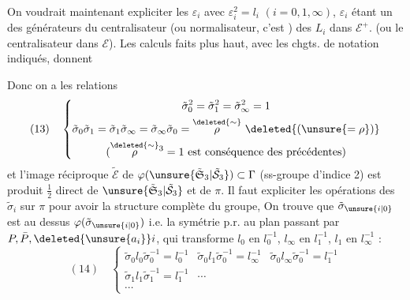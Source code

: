 On voudrait maintenant expliciter les $\varepsilon_i$ avec $\varepsilon_i^2=l_i$ $(i=0,1,\infty)$, $\varepsilon_i$ étant un des générateurs du centralisateur (ou normalisateur, c'est ) des $L_i$ dans $\mathcal E^+$. (ou le centralisateur dans $\mathcal E$). Les calculs faits plus haut, avec les chgts. de notation indiqués, donnent
\deleted{\[
(8)\quad\left\{\begin{aligned}
\varepsilon_0&=l_0^{\unsure{-1}}\sigma_1\unsure{l_1^{-1}|l_0^{-1}}\\
\varepsilon_1&=l_\infty^{-1}\sigma_\infty l_1^{-1}\\
\varepsilon_\infty&=l_0^{-1}\sigma_0 l_\infty^{\unsure{-1}}
\end{aligned}\right.
\]}

Donc on a les relations
\[
(13)\quad\left\{\begin{gathered}
\tilde\sigma_0^2=\tilde\sigma_1^2=\tilde\sigma_\infty^2=1\\
\tilde\sigma_0\tilde\sigma_1=\tilde\sigma_1\tilde\sigma_\infty=\tilde\sigma_\infty\tilde\sigma_0
=\overset{\deleted{\sim}}{\rho}\ \deleted{(\unsure{=\rho})}\\
(\overset{\deleted{\sim}}{\rho}{}^3=1\text{ est conséquence des précédentes})
\end{gathered}\right.
\]
et l'image réciproque $\tilde{\mathcal E}$ de $\varphi(\unsure{\tilde{\mathfrak S}_3|\tilde{\mathcal S}_3})\subset\Gamma$ (ss-groupe d'indice 2) est produit $\frac12$ direct de $\unsure{\tilde{\mathfrak S}_3|\tilde{\mathcal S}_3}$ et de $\pi$. Il faut expliciter les opérations des $\tilde\sigma_i$ sur $\pi$ pour avoir la structure complète du groupe, On trouve que $\tilde\sigma_{\unsure{i|0}}$ est au dessus $\varphi(\tilde\sigma_{\unsure{i|0}})$ i.e. la symétrie p.r. au plan passant par $P,\bar P,\deleted{\unsure{a_i}}i$, qui transforme $l_0$ en $l_0^{-1}$, $l_\infty$ en $l_1^{-1}$, $l_1$ en $l_\infty^{-1}$ :
\[
(14)\quad\left\{\begin{array}{lll}
\tilde\sigma_0l_0\tilde\sigma_0^{-1}=l_0^{-1}&
\tilde\sigma_0l_1\tilde\sigma_0^{-1}=l_\infty^{-1}&
\tilde\sigma_0l_\infty\tilde\sigma_0^{-1}=l_1^{-1}\\
\tilde\sigma_1l_1\tilde\sigma_1^{-1}=l_1^{-1}&\cdots&\\
\cdots&&
\end{array}\right.
\]

